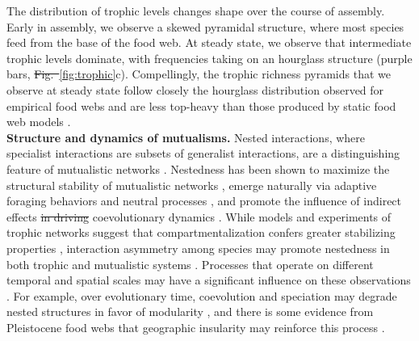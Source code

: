 \documentclass[twocolumn,preprintnumbers,amsmath,amssymb,superscriptaddress,linenumbers]{revtex4-1}
\providecommand{\DIFadd}[1]{{\protect\color{blue}\uwave{#1}}} %
\providecommand{\DIFdel}[1]{{\protect\color{red}\sout{#1}}}                      %
\providecommand{\DIFaddbegin}{} %
\providecommand{\DIFaddend}{} %
\providecommand{\DIFdelbegin}{} %
\providecommand{\DIFdelend}{} %
\newcommand{\DIFscaledelfig}{0.5}
\newlength{\DIFdelgraphicswidth} %
\newlength{\DIFdelgraphicsheight} %
\newcommand{\DIFaddincludegraphics}[2][]{{\color{blue}\fbox{\DIFOincludegraphics[#1]{#2}}}} %
\newcommand{\DIFdelincludegraphics}[2][]{%
\sbox{\DIFdelgraphicsbox}{\DIFOincludegraphics[#1]{#2}}%
\settoboxwidth{\DIFdelgraphicswidth}{\DIFdelgraphicsbox} %
\settoboxtotalheight{\DIFdelgraphicsheight}{\DIFdelgraphicsbox} %
\scalebox{\DIFscaledelfig}{%
\parbox[b]{\DIFdelgraphicswidth}{\usebox{\DIFdelgraphicsbox}\\[-\baselineskip] \rule{\DIFdelgraphicswidth}{0em}}\llap{\resizebox{\DIFdelgraphicswidth}{\DIFdelgraphicsheight}{%
\setlength{\unitlength}{\DIFdelgraphicswidth}%
\begin{picture}(1,1)%
\thicklines\linethickness{2pt} %
{\color[rgb]{1,0,0}\put(0,0){\framebox(1,1){}}}%
{\color[rgb]{1,0,0}\put(0,0){\line( 1,1){1}}}%
{\color[rgb]{1,0,0}\put(0,1){\line(1,-1){1}}}%
\end{picture}%
}\hspace*{3pt}}} %
} %
\DeclareRobustCommand{\DIFaddbegin}{\DIFOaddbegin \let\includegraphics\DIFaddincludegraphics} %
\DeclareRobustCommand{\DIFaddend}{\DIFOaddend \let\includegraphics\DIFOincludegraphics} %
\DeclareRobustCommand{\DIFdelbegin}{\DIFOdelbegin \let\includegraphics\DIFdelincludegraphics} %
\DeclareRobustCommand{\DIFdelend}{\DIFOaddend \let\includegraphics\DIFOincludegraphics} %
\begin{document}
The distribution of trophic levels changes shape over the course of assembly.
Early in assembly, we observe a skewed pyramidal structure, where most species feed from the base of the food web.
At steady state, we observe that intermediate trophic levels dominate, with frequencies taking on an hourglass structure (purple bars, \DIFdelbegin \DIFdel{Fig.\ }\DIFdelend \DIFaddbegin \DIFadd{Figure }\DIFaddend \ref{fig:trophic}c).
Compellingly, the trophic richness pyramids that we observe at steady state follow closely the hourglass distribution observed for empirical food webs and are less top-heavy than those produced by static food web models \cite{Turney2016}.\\



\DIFdelbegin %



\DIFdelend %
\vspace{0mm}
\noindent \textbf{Structure and dynamics of mutualisms.}
Nested interactions, where specialist interactions are subsets of generalist interactions, are a distinguishing feature of mutualistic networks \cite{Bascompte2003,Bascompte2006,Guimaraes2006,Araujo2010}.
Nestedness has been shown to maximize the structural stability of mutualistic networks \cite{Rohr2014}, emerge naturally via adaptive foraging behaviors \cite{Valdovinos2016,Valdovinos2019} and neutral processes \cite{Krishna2008}, and promote the influence of indirect effects \DIFdelbegin \DIFdel{in driving }\DIFdelend \DIFaddbegin \DIFadd{on }\DIFaddend coevolutionary dynamics \cite{Guimaraes2017}.
While models and experiments of trophic networks suggest that compartmentalization confers greater stabilizing properties \cite{Stouffer2011,Gilarranz2017}, interaction asymmetry among species may promote nestedness in both trophic \cite{Araujo2010} and mutualistic systems \cite{Pires2011}.
Processes that operate on different temporal and spatial scales may have a significant influence on these observations \cite{Massol2011}.
For example, over evolutionary time, coevolution and speciation may degrade nested structures in favor of modularity \cite{Ponisio2019}, and there is some evidence from Pleistocene food webs that geographic insularity may reinforce this process \cite{Yeakel2013}.
\end{document}
